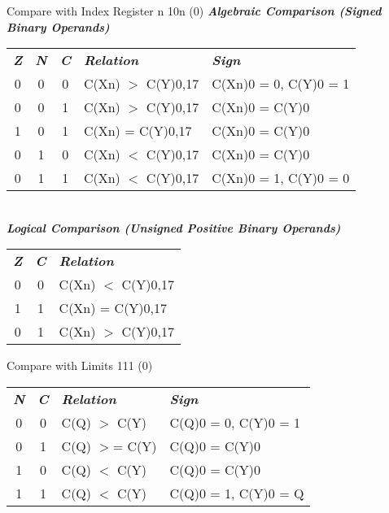 { {Compare with Index Register n} {10n (0)}
\inbif
{}
\incss
\inina
\textbf{\textsl{Algebraic Comparison (Signed Binary Operands)}}\\
\begin{tabular}{c c c l l}
\textit{\textbf{Z}} & 
\textit{\textbf{N}} & 
\textit{\textbf{C}} & 
\textit{\textbf{Relation}} & 
\textit{\textbf{Sign}} \\
0 & 0 & 0 & C(Xn) $>$ C(Y)0,17 & C(Xn)0 = 0, C(Y)0 = 1 \\
0 & 0 & 1 & C(Xn) $>$ C(Y)0,17 & C(Xn)0 = C(Y)0 \\
1 & 0 & 1 & C(Xn) = C(Y)0,17 & C(Xn)0 = C(Y)0 \\
0 & 1 & 0 & C(Xn) $<$ C(Y)0,17 & C(Xn)0 = C(Y)0 \\
0 & 1 & 1 & C(Xn) $<$ C(Y)0,17 & C(Xn)0 = 1, C(Y)0 = 0 \\
\end{tabular} \\
\textbf{\textsl{Logical Comparison (Unsigned Positive Binary Operands)}}\\
\begin{tabular}{c c l}
\textit{\textbf{Z}} & 
\textit{\textbf{C}} & 
\textit{\textbf{Relation}} \\
0 & 0 & C(Xn) $<$ C(Y)0,17 \\
1 & 1 & C(Xn) = C(Y)0,17 \\
0 & 1 & C(Xn) $>$ C(Y)0,17 \\
\end{tabular}




 {Compare with Limits} {111 (0)}
\inbif
{}
\inall
\inina
{}
\begin{tabular}{c c l l}
\textit{\textbf{N}} & 
\textit{\textbf{C}} & 
\textit{\textbf{Relation}} & 
\textit{\textbf{Sign}} \\
0 & 0 & C(Q) $>$ C(Y) & C(Q)0 = 0, C(Y)0 = 1 \\
0 & 1 & C(Q) $>$= C(Y) & C(Q)0 = C(Y)0 \\
1 & 0 & C(Q) $<$ C(Y) & C(Q)0 = C(Y)0 \\
1 & 1 & C(Q) $<$ C(Y) & C(Q)0 = 1, C(Y)0 = Q \\
\end{tabular} \\

}

